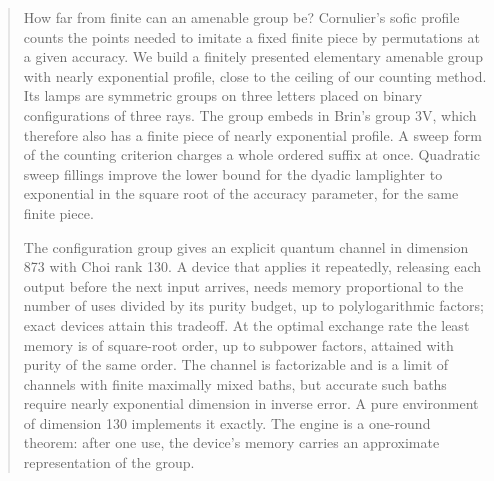 \begin{abstract}
How far from finite can an amenable group be? Cornulier's sofic profile counts the points needed to imitate a fixed finite piece by permutations at a given accuracy. We build a finitely presented elementary amenable group with nearly exponential profile, close to the ceiling of our counting method. Its lamps are symmetric groups on three letters placed on binary configurations of three rays. The group embeds in Brin's group 3V, which therefore also has a finite piece of nearly exponential profile. A sweep form of the counting criterion charges a whole ordered suffix at once. Quadratic sweep fillings improve the lower bound for the dyadic lamplighter to exponential in the square root of the accuracy parameter, for the same finite piece.

The configuration group gives an explicit quantum channel in dimension 873 with Choi rank 130. A device that applies it repeatedly, releasing each output before the next input arrives, needs memory proportional to the number of uses divided by its purity budget, up to polylogarithmic factors; exact devices attain this tradeoff. At the optimal exchange rate the least memory is of square-root order, up to subpower factors, attained with purity of the same order. The channel is factorizable and is a limit of channels with finite maximally mixed baths, but accurate such baths require nearly exponential dimension in inverse error. A pure environment of dimension 130 implements it exactly. The engine is a one-round theorem: after one use, the device's memory carries an approximate representation of the group.
\end{abstract}
